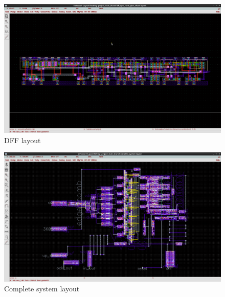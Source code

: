 \documentclass[a4paper,12pt]{article} \usepackage{graphicx}
\begin{document}
\begin{figure}[h]
  \centering
  \includegraphics[width=1.0\textwidth]{../Bilder/Layout/dff_sync_reset_qbar_clkset.png}
  \caption{DFF layout}
  \label{fig:dff_final}
\end{figure}

\begin{figure}[h]
  \centering
  \includegraphics[width=1.0\textwidth]{../Bilder/Layout/complete_system.png}
  \caption{Complete system layout}
  \label{fig:complete_system_final}
\end{figure}
\end{document}
